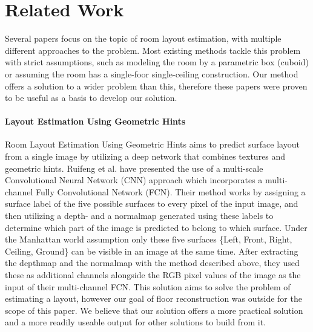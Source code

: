 \section{Related Work}
\label{sec:relatedwork}

Several papers focus on the topic of room layout estimation, with multiple
different approaches to the problem. Most existing methods tackle this problem
with strict assumptions, such as modeling the room by a parametric box (cuboid)
or assuming the room has a single-foor single-ceiling construction. Our method offers a solution to a wider problem than this, therefore these papers were proven to be useful as a basis to develop our solution.

\paragraph{Layout Estimation Using Geometric Hints} Room Layout Estimation Using
Geometric Hints\cite{8451365} aims to predict surface layout from a single image
by utilizing a deep network that combines textures and geometric hints. 
Ruifeng et al. \cite{8451365} have presented the use of a multi-scale 
Convolutional Neural Network (CNN) approach which incorporates a multi-channel
Fully Convolutional Network (FCN).
Their method works by assigning a surface label of the five possible surfaces to
every pixel of the input image, and then utilizing a depth- and a normalmap
generated using these labels to determine which part of the image is predicted to
belong to which surface. Under the Manhattan world assumption\cite{790349} only
these five surfaces \{Left, Front, Right, Ceiling, Ground\} can be visible in an
image at the same time. After extracting the depthmap and the normalmap with the
method described above, they used these as additional channels alongside the RGB
pixel values of the image as the input of their multi-channel FCN. This solution aims to solve the problem of estimating a layout, however our goal of floor reconstruction was outside for the scope of this paper. We believe that our solution offers a more practical solution and a more readily useable output for other solutions to build from it.  

